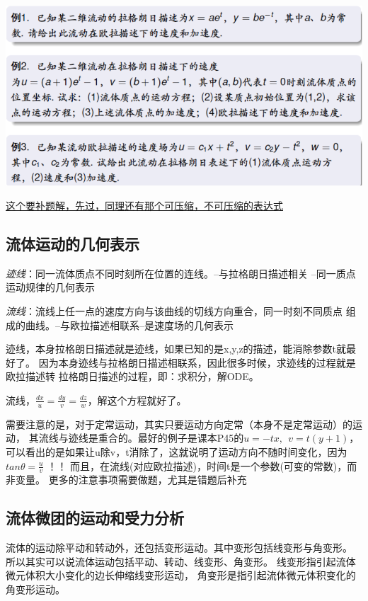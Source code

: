 \documentclass[UTF8,12pt]{article}
\begin{document}
\begin{center}
    \includegraphics[width=0.9\linewidth]{img/oula2lar.png}
\end{center}

{\color{red} \uline{这个要补题解，先过，同理还有那个可压缩，不可压缩的表达式}}

\subsection{流体运动的几何表示}

\emph{迹线}：同一流体质点不同时刻所在位置的连线。--与拉格朗日描述相关
--同一质点运动规律的几何表示

\emph{流线}：流线上任一点的速度方向与该曲线的切线方向重合，同一时刻不同质点
组成的曲线。--与欧拉描述相联系--是速度场的几何表示

迹线，本身拉格朗日描述就是迹线，如果已知的是x,y,z的描述，能消除参数t就最好了。
因为本身迹线与拉格朗日描述相联系，因此很多时候，求迹线的过程就是欧拉描述转
拉格朗日描述的过程，即：求积分，解ODE。

流线，$\frac{dx}{u} = \frac{dy}{v} = \frac{dz}{w}$，解这个方程就好了。

{\color{cyan} 需要注意的是}，对于定常运动，其实只要运动方向定常（本身不是定常运动）的运动，
其流线与迹线是重合的。最好的例子是课本P45的$u = -tx,~~v = t(y+1)$，
可以看出的是如果让u除v，t消除了，这就说明了运动方向不随时间变化，因为$tan \theta = \frac{u}{v}$
！！ 而且，在流线(对应欧拉描述)，时间t是一个参数(可变的常数)，而非变量。
{\color{red} 更多的注意事项需要做题，尤其是错题后补充}

\subsection{流体微团的运动和受力分析}
流体的运动除平动和转动外，还包括变形运动。其中变形包括线变形与角变形。
所以其实可以说流体运动包括平动、转动、线变形、角变形。
线变形指引起流体微元体积大小变化的边长伸缩线变形运动，
角变形是指引起流体微元体积变化的角变形运动。
\end{document}
